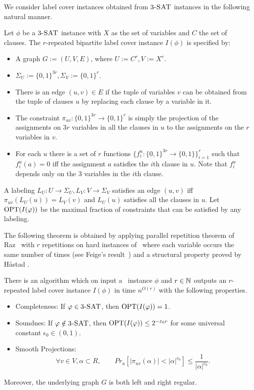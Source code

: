 We consider label cover instances obtained from $\textnormal{$3$\textsc{-SAT}}$ instances in the
following natural manner. 
\begin{definition}
\label{def:label-cover} 
Let $\phi$ be a $\textnormal{$3$\textsc{-SAT}}$ instance with $X$ as the set of
variables and $C$ the set of clauses. The $r$-repeated bipartite label cover
instance $I(\phi)$ is specified by: 
\begin{itemize} 
\item A graph $G:=(U,V,E)$,
where $U:=C^r, V:=X^r$. \item $\Sigma_U := \{0,1\}^{3r},\Sigma_V := \{0,1\}^r$.
\item There is an edge $(u,v) \in E$ if the tuple of variables $v$ can be
obtained from the tuple of clauses $u$ by replacing each clause by a variable in
it. 
\item The constraint $\pi_{uv}:\{0,1\}^{3r}\rightarrow \{0,1\}^{r}$ is
simply the projection of the assignments on $3r$ variables in all the clauses in
$u$ to the assignments on the $r$ variables in $v$. \item For each $u$ there is
a set of $r$ functions $\{f^u_i:\{0,1\}^{3r} \rightarrow \{0,1\} \}_{i=1}^r$
such that $f^u_i(a)=0$ iff the assignment $a$ satisfies the $i$th clause in $u$.
Note that $f^u_i$ depends only on the $3$ variables in the $i$th clause.
\end{itemize} 
A labeling $L_U:U\rightarrow \Sigma_U,L_V:V\rightarrow \Sigma_V$
satisfies an edge $(u,v)$ iff $\pi_{uv}(L_U(u))=L_V(v)$ and $L_U(u)$ satisfies
all the clauses in $u$. Let $\textnormal{OPT}(I(\varphi))$ be the maximal fraction of
constraints that can be satisfied by any labeling. 
\end{definition} 
The
following theorem is obtained by applying  parallel repetition
theorem of Raz~\cite{Raz1998} with $r$ repetitions on hard instances of
\MAXTSAT\ where each variable occurs the same number of
times (see Feige's result~\cite{Feige1998}) and a structural property proved by
H\aa stad \cite[Lemma 6.9]{Hastad2001}. 

\begin{theorem} \label{thm:label-cover} 
There is an
algorithm which on input a \TSAT\ instance $\phi$ and $r\in \mathbb N$ outputs an
$r$-repeated label cover instance $I(\phi)$ in time $n^{O(r)}$ with the
following properties. 
\begin{itemize} 
\item Completeness: If $\varphi \in \textnormal{$3$\textsc{-SAT}}$, then $\textnormal{OPT}(I(\varphi))=1$. 
\item Soundnes: If $\varphi \notin \textnormal{$3$\textsc{-SAT}}$, then $\textnormal{OPT}(I(\varphi)) \leq
2^{-\varepsilon_0 r}$ for some universal constant $\epsilon_0\in (0,1)$.
\item Smooth Projections: 		
$$\forall v \in V, \alpha \subset R, \qquad Pr_u \left[ |\pi_{uv}(\alpha)| <|\alpha|^{c_0}\right] \leq \frac{1}{|\alpha|^{c_0}}.$$
\end{itemize} 
Moreover, the underlying graph $G$ is both left and right regular.
\end{theorem}


